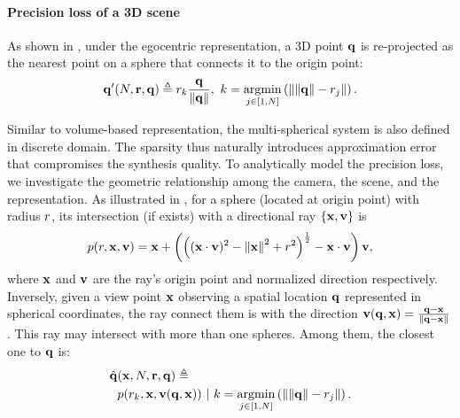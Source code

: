 \paragraph{Precision loss of a 3D scene}
As shown in , under the egocentric representation, a 3D point $\mathbf{q}$ is re-projected as the nearest point on a sphere that connects it to the origin point:
\begin{equation}\label{eq:closestPoint3D}
{\pt^\prime}(\sphereNum,\mathbf{\sphereRadius},\SpatialPt) \triangleq \sphereRadius_k \frac{\pt}{\norm{\pt}}, \ k=\argmin_{j\in[1,\sphereNum]}\left(\norm{\norm{\SpatialPt}-\sphereRadius_j}\right).
\end{equation}

Similar to volume-based representation, the multi-spherical system is also defined in discrete domain. The sparsity thus naturally introduces approximation error that compromises the synthesis quality. To analytically model the precision loss, we investigate the geometric relationship among the camera, the scene, and the representation.
As illustrated in ,  for a sphere (located at origin point) with radius $r$, its intersection (if exists) with a directional ray $\{\mathbf{x},\mathbf{v}\}$ is
\begin{equation}
p(r,\mathbf{x},\mathbf{v}) = \mathbf{x} + \left({\left((\mathbf{x}\cdot\mathbf{v})^2-\left\lVert\mathbf{x}\right\rVert^2+r^2\right)}^{\frac{1}{2}}-\mathbf{x}\cdot\mathbf{v}\right)\mathbf{v},
\label{eq:raySphereIntersection}
\end{equation}
where $\mathbf{x}$ and $\mathbf{v}$ are the ray's origin point and normalized direction respectively.
Inversely, given a view point $\mathbf{x}$ observing a spatial location $\mathbf{q}$ represented in spherical coordinates, the ray connect them is with the direction $\mathbf{v}(\mathbf{q},\mathbf{x})=\frac{\mathbf{q}-\mathbf{x}}{\left\lVert\mathbf{q}-\mathbf{x}\right\rVert}$. This ray may intersect with more than one spheres. Among them, the closest one to $\mathbf{q}$ is:
\begin{equation}\label{eq:closestPointImg}
\begin{aligned}
    \hat{\pt}&(\rayo,\sphereNum, \mathbf{\sphereRadius},\SpatialPt) \triangleq \\
    &\intersectionFunc(\sphereRadius_k,\rayo,\rayd(\SpatialPt,\rayo))\ |\ k=\argmin_{j\in[1,\sphereNum]}\left(\norm{\norm{\SpatialPt}-\sphereRadius_j}\right).
\end{aligned}
\end{equation}
